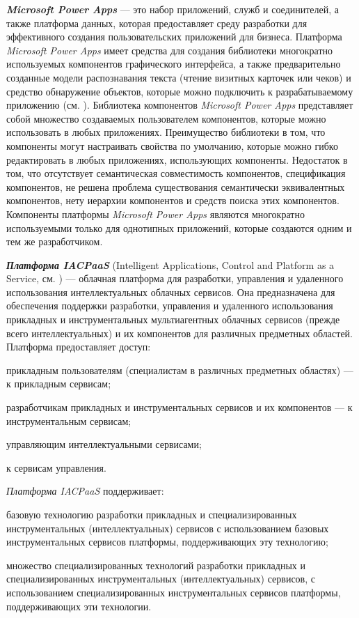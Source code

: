 \textbf{\textit{Microsoft Power Apps}} --- это набор приложений, служб и соединителей, а также платформа данных, которая предоставляет среду разработки для эффективного создания пользовательских приложений для бизнеса. Платформа \textit{Microsoft Power Apps} имеет средства для создания библиотеки многократно используемых компонентов графического интерфейса, а также предварительно созданные модели распознавания текста (чтение визитных карточек или чеков) и средство обнаружение объектов, которые можно подключить к разрабатываемому приложению (см. ). Библиотека компонентов \textit{Microsoft Power Apps} представляет собой множество создаваемых пользователем компонентов, которые можно использовать в любых приложениях. Преимущество библиотеки в том, что компоненты могут настраивать свойства по умолчанию, которые можно гибко редактировать в любых приложениях, использующих компоненты. Недостаток в том, что отсутствует семантическая совместимость компонентов, спецификация компонентов, не решена проблема существования семантически эквивалентных компонентов, нету иерархии компонентов и средств поиска этих компонентов. Компоненты платформы \textit{Microsoft Power Apps} являются многократно используемыми только для однотипных приложений, которые создаются одним и тем же разработчиком.

\textbf{\textit{Платформа IACPaaS}} (Intelligent Applications, Control and Platform as a Service, см. ) --- облачная платформа для разработки, управления и удаленного использования интеллектуальных облачных сервисов. Она предназначена для обеспечения поддержки разработки, управления и удаленного использования прикладных и инструментальных мультиагентных облачных сервисов (прежде всего интеллектуальных) и их компонентов для различных предметных областей. Платформа предоставляет доступ:
\begin{textitemize}
	\item прикладным пользователям (специалистам в различных предметных областях) --- к прикладным сервисам;
	\item разработчикам прикладных и инструментальных сервисов и их компонентов --- к инструментальным сервисам;
	\item управляющим интеллектуальными сервисами;
	\item к сервисам управления.
\end{textitemize}

\textit{Платформа IACPaaS} поддерживает:

\begin{textitemize}
	\item базовую технологию разработки прикладных и специализированных инструментальных (интеллектуальных) сервисов с использованием базовых инструментальных сервисов платформы, поддерживающих эту технологию;
	\item множество специализированных технологий разработки прикладных и специализированных инструментальных (интеллектуальных) сервисов, с использованием специализированных инструментальных сервисов платформы, поддерживающих эти технологии.
\end{textitemize}

